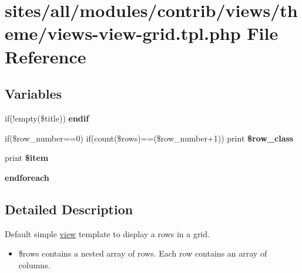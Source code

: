 \hypertarget{views-view-grid_8tpl_8php}{
\section{sites/all/modules/contrib/views/theme/views-view-grid.tpl.php File Reference}
\label{views-view-grid_8tpl_8php}
}
\subsection*{Variables}
\begin{CompactItemize}
\item 
\hypertarget{views-view-grid_8tpl_8php_de91bc69a503a5ab88f3fdb968225b63}{
if(!empty(\$title)) \textbf{endif}}
\label{views-view-grid_8tpl_8php_de91bc69a503a5ab88f3fdb968225b63}

\item 
\hypertarget{views-view-grid_8tpl_8php_8296e023005b85318335b4d3a0b064b3}{
if(\$row\_\-number==0) if(count(\$rows)==(\$row\_\-number+1)) print \textbf{\$row\_\-class}}
\label{views-view-grid_8tpl_8php_8296e023005b85318335b4d3a0b064b3}

\item 
\hypertarget{views-view-grid_8tpl_8php_ca1b45cc0c3cbd691722119ffe243256}{
print \textbf{\$item}}
\label{views-view-grid_8tpl_8php_ca1b45cc0c3cbd691722119ffe243256}

\item 
\hypertarget{views-view-grid_8tpl_8php_672d9707ef91db026c210f98cc601123}{
\textbf{endforeach}}
\label{views-view-grid_8tpl_8php_672d9707ef91db026c210f98cc601123}

\end{CompactItemize}


\subsection{Detailed Description}
Default simple \hyperlink{classview}{view} template to display a rows in a grid.

\begin{itemize}
\item \$rows contains a nested array of rows. Each row contains an array of columns. \end{itemize}
